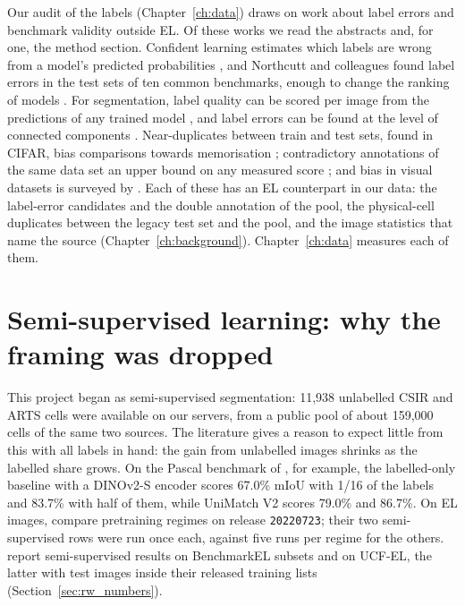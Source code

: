 Our audit of the labels (Chapter~\ref{ch:data}) draws on work about label errors and benchmark validity outside EL. Of these
works we read the abstracts and, for one, the method section. Confident learning estimates which labels are wrong from a
model's predicted probabilities \citep{northcutt2021confident}, and Northcutt and colleagues found label errors in the test sets
of ten common benchmarks, enough to change the ranking of models \citep{northcutt2021pervasive}. For segmentation, label quality
can be scored per image from the predictions of any trained model \citep{lad2023labelquality}, and label errors can be found
at the level of connected components \citep{rottmann2023labelerrors}. Near-duplicates between train and test sets, found
in CIFAR, bias comparisons towards memorisation \citep{barz2020cifair}; contradictory annotations of the same data set an
upper bound on any measured score \citep{tschirschwitz2025label}; and bias in visual datasets is surveyed by
\citet{fabbrizzi2022bias}. Each of these has an EL counterpart in our data: the label-error candidates and the double annotation of the pool, the physical-cell duplicates between the legacy test
set and the pool, and the image statistics that name the source (Chapter~\ref{ch:background}). Chapter~\ref{ch:data} measures
each of them.

\section{Semi-supervised learning: why the framing was dropped}\label{sec:rw_ssl}

This project began as semi-supervised segmentation: 11,938 unlabelled CSIR and ARTS cells were available on our servers,
from a public pool of about 159,000 cells of the same two sources. The literature gives a reason to expect little from this
with all labels in hand: the gain from unlabelled images shrinks as the labelled share grows. On the Pascal benchmark of
\citet{yang2025unimatchv2}, for example, the labelled-only baseline with a DINOv2-S encoder scores 67.0\% mIoU with 1/16 of the
labels and 83.7\% with half of them, while UniMatch V2 scores 79.0\% and 86.7\%. On EL images, \citet{torpey2024pretraining}
compare pretraining regimes on release \texttt{20220723}; their two semi-supervised rows were run once each, against five runs per
regime for the others. \citet{jha2025pvs3} report semi-supervised results on BenchmarkEL subsets and on UCF-EL, the latter with
test images inside their released training lists (Section~\ref{sec:rw_numbers}).


